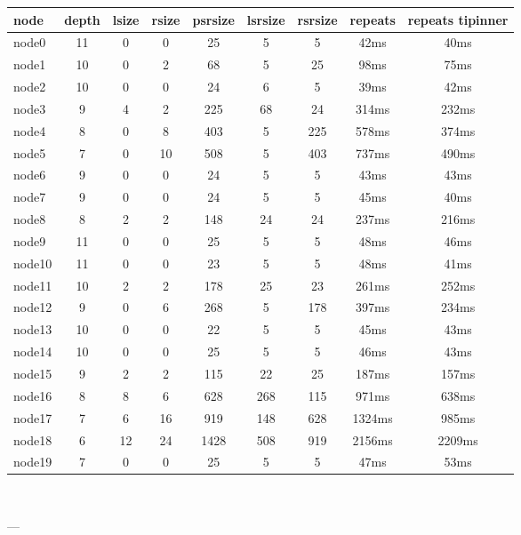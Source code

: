

\begin{tabular}{|l|c|c|c|c|c|c|c|c|}
\hline node & depth & lsize & rsize & psrsize & lsrsize & rsrsize   & repeats & repeats tipinner\\
    \hline node0 & 11 & 0 & 0 & 25 & 5 & 5 & 42ms & 40ms\\
    \hline node1 & 10 & 0 & 2 & 68 & 5 & 25 & 98ms & 75ms\\
    \hline node2 & 10 & 0 & 0 & 24 & 6 & 5 & 39ms & 42ms\\
    \hline node3 & 9 & 4 & 2 & 225 & 68 & 24 & 314ms & 232ms\\
    \hline node4 & 8 & 0 & 8 & 403 & 5 & 225 & 578ms & 374ms\\
    \hline node5 & 7 & 0 & 10 & 508 & 5 & 403 & 737ms & 490ms\\
    \hline node6 & 9 & 0 & 0 & 24 & 5 & 5 & 43ms & 43ms\\
    \hline node7 & 9 & 0 & 0 & 24 & 5 & 5 & 45ms & 40ms\\
    \hline node8 & 8 & 2 & 2 & 148 & 24 & 24 & 237ms & 216ms\\
    \hline node9 & 11 & 0 & 0 & 25 & 5 & 5 & 48ms & 46ms\\
    \hline node10 & 11 & 0 & 0 & 23 & 5 & 5 & 48ms & 41ms\\
    \hline node11 & 10 & 2 & 2 & 178 & 25 & 23 & 261ms & 252ms\\
    \hline node12 & 9 & 0 & 6 & 268 & 5 & 178 & 397ms & 234ms\\
    \hline node13 & 10 & 0 & 0 & 22 & 5 & 5 & 45ms & 43ms\\
    \hline node14 & 10 & 0 & 0 & 25 & 5 & 5 & 46ms & 43ms\\
    \hline node15 & 9 & 2 & 2 & 115 & 22 & 25 & 187ms & 157ms\\
    \hline node16 & 8 & 8 & 6 & 628 & 268 & 115 & 971ms & 638ms\\
    \hline node17 & 7 & 6 & 16 & 919 & 148 & 628 & 1324ms & 985ms\\
    \hline node18 & 6 & 12 & 24 & 1428 & 508 & 919 & 2156ms & 2209ms\\
    \hline node19 & 7 & 0 & 0 & 25 & 5 & 5 & 47ms & 53ms\\

\hline
\end{tabular} \

---


